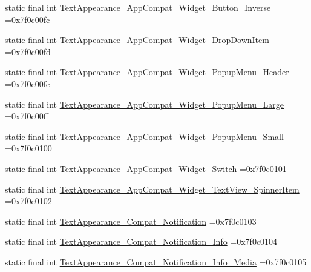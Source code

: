 \begin{DoxyCompactItemize}
\item 
static final int \mbox{\hyperlink{classbr_1_1unb_1_1cic_1_1mp_1_1marketmaster_1_1test_1_1R_1_1style_a517b9679c108c18547bd73f5db231fe2}{Text\+Appearance\+\_\+\+App\+Compat\+\_\+\+Widget\+\_\+\+Button\+\_\+\+Inverse}} =0x7f0c00fc
\item 
static final int \mbox{\hyperlink{classbr_1_1unb_1_1cic_1_1mp_1_1marketmaster_1_1test_1_1R_1_1style_abb2ebbd422a32fceac645086a3076265}{Text\+Appearance\+\_\+\+App\+Compat\+\_\+\+Widget\+\_\+\+Drop\+Down\+Item}} =0x7f0c00fd
\item 
static final int \mbox{\hyperlink{classbr_1_1unb_1_1cic_1_1mp_1_1marketmaster_1_1test_1_1R_1_1style_ae5c9028c6fc0a1e6bc0675cd02dbcace}{Text\+Appearance\+\_\+\+App\+Compat\+\_\+\+Widget\+\_\+\+Popup\+Menu\+\_\+\+Header}} =0x7f0c00fe
\item 
static final int \mbox{\hyperlink{classbr_1_1unb_1_1cic_1_1mp_1_1marketmaster_1_1test_1_1R_1_1style_a1ae4a750f4a79a65597fc4dbdae9f84d}{Text\+Appearance\+\_\+\+App\+Compat\+\_\+\+Widget\+\_\+\+Popup\+Menu\+\_\+\+Large}} =0x7f0c00ff
\item 
static final int \mbox{\hyperlink{classbr_1_1unb_1_1cic_1_1mp_1_1marketmaster_1_1test_1_1R_1_1style_aa7088153fdd02f92259ee20a4abb2d7d}{Text\+Appearance\+\_\+\+App\+Compat\+\_\+\+Widget\+\_\+\+Popup\+Menu\+\_\+\+Small}} =0x7f0c0100
\item 
static final int \mbox{\hyperlink{classbr_1_1unb_1_1cic_1_1mp_1_1marketmaster_1_1test_1_1R_1_1style_a66bfcccd16f1a516853e5ad2b0c31e34}{Text\+Appearance\+\_\+\+App\+Compat\+\_\+\+Widget\+\_\+\+Switch}} =0x7f0c0101
\item 
static final int \mbox{\hyperlink{classbr_1_1unb_1_1cic_1_1mp_1_1marketmaster_1_1test_1_1R_1_1style_a52a6b3001d7893ac41dff895b62b5ca0}{Text\+Appearance\+\_\+\+App\+Compat\+\_\+\+Widget\+\_\+\+Text\+View\+\_\+\+Spinner\+Item}} =0x7f0c0102
\item 
static final int \mbox{\hyperlink{classbr_1_1unb_1_1cic_1_1mp_1_1marketmaster_1_1test_1_1R_1_1style_ae5fbb390bde25b1ad156d6da06f771ae}{Text\+Appearance\+\_\+\+Compat\+\_\+\+Notification}} =0x7f0c0103
\item 
static final int \mbox{\hyperlink{classbr_1_1unb_1_1cic_1_1mp_1_1marketmaster_1_1test_1_1R_1_1style_a302726e8bd99937f1ed21dcf00ddace0}{Text\+Appearance\+\_\+\+Compat\+\_\+\+Notification\+\_\+\+Info}} =0x7f0c0104
\item 
static final int \mbox{\hyperlink{classbr_1_1unb_1_1cic_1_1mp_1_1marketmaster_1_1test_1_1R_1_1style_a0a5888777aaf44772978d7c3283c92c2}{Text\+Appearance\+\_\+\+Compat\+\_\+\+Notification\+\_\+\+Info\+\_\+\+Media}} =0x7f0c0105

\end{DoxyCompactItemize}
